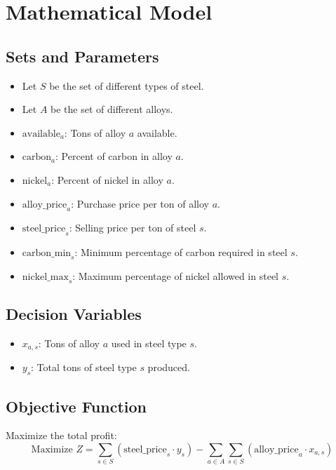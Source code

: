 \documentclass{article}
\begin{document}
\section*{Mathematical Model}

\subsection*{Sets and Parameters}
\begin{itemize}
    \item Let \( S \) be the set of different types of steel.
    \item Let \( A \) be the set of different alloys.
    \item \( \text{available}_a \): Tons of alloy \( a \) available.
    \item \( \text{carbon}_a \): Percent of carbon in alloy \( a \).
    \item \( \text{nickel}_a \): Percent of nickel in alloy \( a \).
    \item \( \text{alloy\_price}_a \): Purchase price per ton of alloy \( a \).
    \item \( \text{steel\_price}_s \): Selling price per ton of steel \( s \).
    \item \( \text{carbon\_min}_s \): Minimum percentage of carbon required in steel \( s \).
    \item \( \text{nickel\_max}_s \): Maximum percentage of nickel allowed in steel \( s \).
\end{itemize}

\subsection*{Decision Variables}
\begin{itemize}
    \item \( x_{a,s} \): Tons of alloy \( a \) used in steel type \( s \).
    \item \( y_s \): Total tons of steel type \( s \) produced.
\end{itemize}

\subsection*{Objective Function}
Maximize the total profit:
\[
\text{Maximize } Z = \sum_{s \in S} \left( \text{steel\_price}_s \cdot y_s \right) - \sum_{a \in A} \sum_{s \in S} \left( \text{alloy\_price}_a \cdot x_{a,s} \right)
\]
\end{document}
